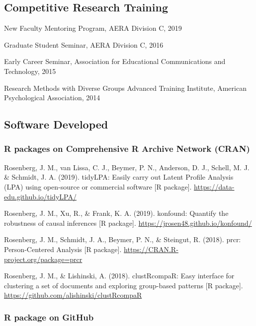 \documentclass[14,]{article}
\begin{document}
\hypertarget{competitive-research-training}{%
\subsection{Competitive Research
Training}\label{competitive-research-training}}

New Faculty Mentoring Program, AERA Division C, 2019

Graduate Student Seminar, AERA Division C, 2016

Early Career Seminar, Association for Educational Communications and
Technology, 2015

Research Methods with Diverse Groups Advanced Training Institute,
American Psychological Association, 2014

\hypertarget{software-developed}{%
\subsection{Software Developed}\label{software-developed}}

\hypertarget{r-packages-on-comprehensive-r-archive-network-cran}{%
\subsubsection{R packages on Comprehensive R Archive Network
(CRAN)}\label{r-packages-on-comprehensive-r-archive-network-cran}}

Rosenberg, J. M., van Lissa, C. J., Beymer, P. N., Anderson, D. J.,
Schell, M. J. \& Schmidt, J. A. (2019). tidyLPA: Easily carry out Latent
Profile Analysis (LPA) using open-source or commercial software {[}R
package{]}. \url{https://data-edu.github.io/tidyLPA/}

Rosenberg, J. M., Xu, R., \& Frank, K. A. (2019). konfound: Quantify the
robustness of causal inferences {[}R package{]}.
\url{https://jrosen48.github.io/konfound/}

Rosenberg, J. M., Schmidt, J. A., Beymer, P. N., \& Steingut, R. (2018).
prcr: Person-Centered Analysis {[}R package{]}.
\url{https://CRAN.R-project.org/package=prcr}

Rosenberg, J. M., \& Lishinski, A. (2018). clustRcompaR: Easy interface
for clustering a set of documents and exploring group-based patterns
{[}R package{]}. \url{https://github.com/alishinski/clustRcompaR}

\hypertarget{r-package-on-github}{%
\subsubsection{R package on GitHub}\label{r-package-on-github}}
\end{document}
